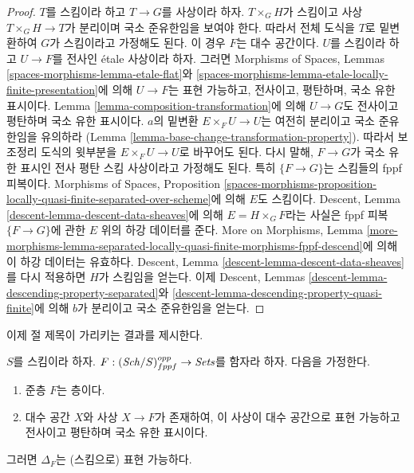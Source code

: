 \begin{proof}
$T$를 스킴이라 하고 $T \to G$를 사상이라 하자. $T \times_G H$가
스킴이고 사상 $T \times_G H \to T$가 분리이며 국소 준유한임을
보여야 한다. 따라서 전체 도식을 $T$로 밑변환하여 $G$가 스킴이라고
가정해도 된다. 이 경우 $F$는 대수 공간이다. $U$를 스킴이라 하고
$U \to F$를 전사인 \'etale 사상이라 하자. 그러면 Morphisms of Spaces,
Lemmas \ref{spaces-morphisms-lemma-etale-flat}와
\ref{spaces-morphisms-lemma-etale-locally-finite-presentation}에 의해
$U \to F$는 표현 가능하고, 전사이고, 평탄하며, 국소 유한 표시이다.
Lemma \ref{lemma-composition-transformation}에 의해 $U \to G$도
전사이고 평탄하며 국소 유한 표시이다. $a$의 밑변환
$E \times_F U \to U$는 여전히 분리이고 국소 준유한임을 유의하라
(Lemma \ref{lemma-base-change-transformation-property}). 따라서 보조정리
도식의 윗부분을 $E \times_F U \to U$로 바꾸어도 된다. 다시 말해,
$F \to G$가 국소 유한 표시인 전사 평탄 스킴 사상이라고 가정해도 된다.
특히 $\{F \to G\}$는 스킴들의 fppf 피복이다. Morphisms of Spaces,
Proposition
\ref{spaces-morphisms-proposition-locally-quasi-finite-separated-over-scheme}에
의해 $E$도 스킴이다. Descent, Lemma
\ref{descent-lemma-descent-data-sheaves}에 의해 $E = H \times_G F$라는
사실은 fppf 피복 $\{F \to G\}$에 관한 $E$ 위의 하강 데이터를 준다.
More on Morphisms, Lemma
\ref{more-morphisms-lemma-separated-locally-quasi-finite-morphisms-fppf-descend}에
의해 이 하강 데이터는 유효하다. Descent, Lemma
\ref{descent-lemma-descent-data-sheaves}를 다시 적용하면 $H$가 스킴임을
얻는다. 이제 Descent, Lemmas
\ref{descent-lemma-descending-property-separated}와
\ref{descent-lemma-descending-property-quasi-finite}에 의해 $b$가 분리이고
국소 준유한임을 얻는다.
\end{proof}

\noindent
이제 절 제목이 가리키는 결과를 제시한다.

\begin{lemma}
\label{lemma-bootstrap-diagonal}
$S$를 스킴이라 하자.
$F : (\mathit{Sch}/S)_{fppf}^{opp} \to \textit{Sets}$를 함자라 하자.
다음을 가정한다.
\begin{enumerate}
\item 준층 $F$는 층이다.
\item 대수 공간 $X$와 사상 $X \to F$가 존재하여, 이 사상이 대수
공간으로 표현 가능하고 전사이고 평탄하며 국소 유한 표시이다.
\end{enumerate}
그러면 $\Delta_F$는 (스킴으로) 표현 가능하다.
\end{lemma}

